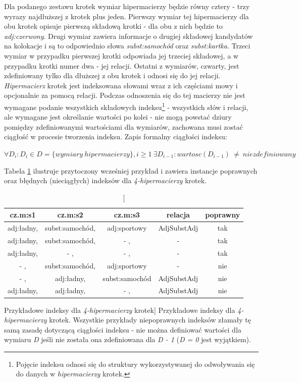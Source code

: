 Dla podanego zestawu krotek wymiar hipermacierzy będzie równy cztery - trzy wyrazy najdłuższej z krotek plus jeden.
Pierwszy wymiar tej hipermacierzy dla obu krotek opisuje pierwszą składową krotki - dla obu z nich będzie to \emph{adj:czerwony}.
Drugi wymiar zawiera informacje o drugiej składowej kandydatów na kolokacje i są to odpowiednio słowa \emph{subst:samochód} oraz \emph{subst:kartka}.
Trzeci wymiar w przypadku pierwszej krotki odpowiada jej trzeciej składowej, a w przypadku krotki numer dwa - jej relacji.
Ostatni z wymiarów, czwarty, jest zdefiniowany tylko dla dłuższej z obu krotek i odnosi się do jej relacji.
\emph{Hipermacierz} krotek jest indeksowana słowami wraz z ich częściami mowy i opcjonalnie za pomocą relacji.
Podczas odnoszenia się do tej macierzy nie jest wymagane podanie wszystkich składowych indeksu\footnote{Pojęcie indeksu odnosi się do struktury wykorzystywanej do odwoływania się do danych w \emph{hipermacierzy} krotek.} - wszystkich słów i relacji, ale wymagane jest określanie wartości po kolei - nie mogą powstać dziury pomiędzy zdefiniowanymi wartościami dla wymiarów, zachowana musi zostać ciągłość w procesie tworzenia indeksu.
Zapis formalny ciągłości indeksu:

\begin{center}
\( \forall D_{i} : D_{i} \in D = \{wymiary \: hipermacierzy \}, i \geq 1 \: \exists D_{i-1} : wartosc(D_{i-1}) \: \neq \: niezdefiniowany \)
\end{center}

Tabela \ref{hypermatrix_indices} ilustruje przytoczony wcześniej przykład i zawiera instancje poprawnych oraz błędnych (nieciągłych) indeksów dla \emph{4-hipermacierzy} krotek.

\begin{table}[h!]
\centering
\begin{tabular}{c c c c c}
\toprule
\textbf{cz.m:s1} & \textbf{cz.m:s2} & \textbf{cz.m:s3} & \textbf{relacja}  & \textbf{poprawny} \\
\midrule
adj:ładny, 	& subst:samochód, 	& adj:sportowy		& AdjSubstAdj	& tak \\
adj:ładny, 	& subst:samochód, 	& - ,			& -		& tak \\
adj:ładny,	& - ,			& - ,			& -		& tak \\
- ,		& subst:samochód, 	& adj:sportowy 		& -		& nie \\
- ,		& adj:ładny,		& subst:samochód	& AdjSubstAdj	& nie \\
adj:ładny,	& adj:ładny,		& - ,			& AdjSubstAdj	& nie \\
\bottomrule
\end{tabular}
\caption
	[Przykładowe indeksy dla \emph{4-hipermacierzy} krotek]
	{Przykładowe indeksy dla \emph{4-hipermacierzy} krotek. Wszystkie przykłady niepoprawnych indeksów złamały tę samą zasadę dotyczącą ciągłości indeksu - nie można definiować wartości dla wymiaru \emph{D} jeśli nie została ona zdefiniowana dla \emph{D - 1} (\emph{D = 0} jest wyjątkiem).}
\label{hypermatrix_indices}
\end{table}

